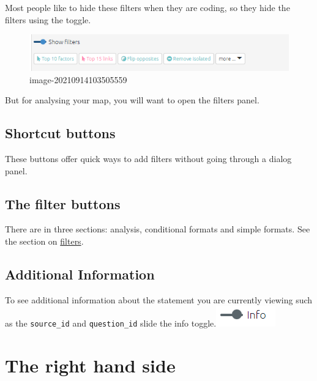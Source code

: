 \documentclass[
]{book}
\begin{document}
Most people like to hide these filters when they are coding, so they hide the filters using the toggle.

\begin{figure}
\centering
\includegraphics{_assets/image-20210914103505559.png}
\caption{image-20210914103505559}
\end{figure}

But for analysing your map, you will want to open the filters panel.

\hypertarget{shortcut-buttons}{%
\subsection{Shortcut buttons}\label{shortcut-buttons}}

These buttons offer quick ways to add filters without going through a dialog panel.

\hypertarget{the-filter-buttons}{%
\subsection{The filter buttons}\label{the-filter-buttons}}

There are in three sections: analysis, conditional formats and simple formats. See the section on \href{https://guide.causalmap.app/all-the-filters.html}{filters}.

\hypertarget{xadditional-informati}{%
\subsection{Additional Information}\label{xadditional-informati}}

To see additional information about the statement you are currently viewing such as the \texttt{source\_id} and \texttt{question\_id} slide the info toggle.\includegraphics{_assets/image-20211220153438354.png}

\hypertarget{rhs}{%
\section{The right hand side}\label{rhs}}
\end{document}
